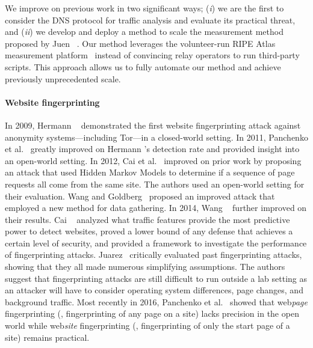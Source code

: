 We improve on previous work in two significant ways; (\emph{i}) we are the first
to consider the DNS protocol for traffic analysis and evaluate its practical
threat, and (\emph{ii}) we develop and deploy a method to scale the measurement
method proposed by Juen \ea~\cite{Juen2015a}.  Our method leverages the
volunteer-run RIPE Atlas measurement platform~\cite{atlas} instead of convincing
relay operators to run third-party scripts.  This approach allows us to fully
automate our method and achieve previously unprecedented scale.

\paragraph{Website fingerprinting}
In 2009, Hermann \ea~\cite{Hermann2009a} demonstrated the first website
fingerprinting attack against anonymity systems---including Tor---in a
closed-world setting.  In 2011, Panchenko et al.~\cite{Panchenko2011a} greatly
improved on Hermann \ea's detection rate and provided insight into an open-world
setting.  In 2012, Cai et al.~\cite{Cai2012a} improved on prior work by
proposing an attack that used Hidden Markov Models to determine if a sequence of
page requests all come from the same site.  The authors used an open-world
setting for their evaluation.  Wang and Goldberg~\cite{Wang2013a} proposed an
improved attack that employed a new method for data gathering.  In 2014, Wang
\ea~\cite{Wang2014a} further improved on their results.  Cai \ea~\cite{Cai2014b}
analyzed what traffic features provide the most predictive power to detect
websites, proved a lower bound of any defense that achieves a certain level of
security, and provided a framework to investigate the performance of
fingerprinting attacks.  Juarez~\cite{Juarez2014a} critically evaluated past
fingerprinting attacks, showing that they all made numerous simplifying
assumptions.  The authors suggest that fingerprinting attacks are still
difficult to run outside a lab setting as an attacker will have to consider
operating system differences, page changes, and background traffic.  Most
recently in 2016, Panchenko et al.~\cite{Panchenko2016a} showed that
web\emph{page} fingerprinting (\ie, fingerprinting of any page on a site) lacks
precision in the open world while web\emph{site} fingerprinting (\ie,
fingerprinting of only the start page of a site) remains practical.  
